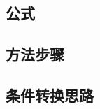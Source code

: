 \documentclass[a4paper,12pt]{article}
\begin{document}
    \subsection{公式}

    \begin{enumerate}

    \end{enumerate}

    \subsection{方法步骤}

    \begin{enumerate}

    \end{enumerate}

    \subsection{条件转换思路}

    \begin{enumerate}

    \end{enumerate}
\end{document}
